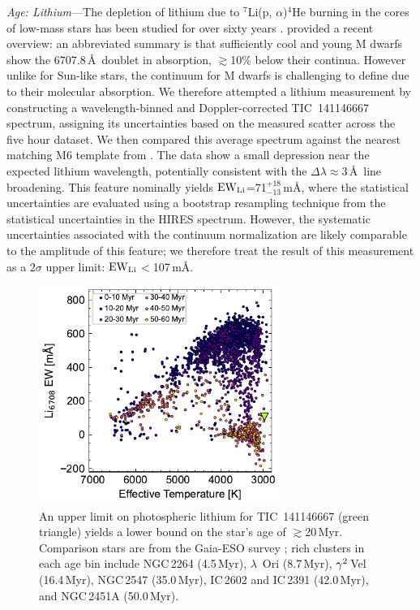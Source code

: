\documentclass{nature3}
\begin{document}
\begin{methods}
{\it Age: Lithium}---The depletion of lithium due to $^7$Li(p,
$\alpha$)$^4$He burning in the cores of low-mass stars has been studied
for over sixty years \cite{Hayashi1963,Bildsten1997,Burke2004}.
\cite{Wood2023} provided a recent overview: an abbreviated
summary is that sufficiently cool and young M dwarfs show the 6707.8\,\AA\
doublet in absorption, $\gtrsim$10\% below their continua.  However unlike
for Sun-like stars, the continuum for M dwarfs is challenging to define due to
their molecular absorption.  We therefore attempted a lithium measurement by
constructing a wavelength-binned and Doppler-corrected TIC~141146667
spectrum, assigning its uncertainties based on the measured scatter
across the five hour dataset.  We then compared this average spectrum
against the nearest matching M6 template from \cite{Bochanski2007}.  The
data show a small depression near the expected lithium wavelength,
potentially consistent with the $\Delta \lambda$$\approx$3\,\AA\ line
broadening.  This feature nominally yields ${\rm EW}_{\rm
Li}$=71$^{+18}_{-13}$\,m\AA, where the statistical uncertainties are
evaluated using a bootstrap resampling technique from the statistical
uncertainties in the HIRES spectrum.  However, the systematic uncertainties associated
with the continuum normalization are likely comparable to
the amplitude of this feature; we therefore treat the result of this
measurement as a $2\sigma$ upper limit: ${\rm EW}_{\rm Li}$$<$107\,m\AA.


\begin{figure}[!t]
  \centering
  \includegraphics[width=0.7\textwidth]{figures/sf2.pdf}
  \caption{An upper limit on photospheric lithium for TIC~141146667
  (green triangle) yields a lower bound on the star's age of
  $\gtrsim$20\,Myr.  Comparison stars are from the Gaia-ESO survey
  \cite{Jeffries2023}; rich clusters in each age bin include NGC\,2264
  (4.5\,Myr), $\lambda$~Ori (8.7\,Myr), ${\rm \gamma}^2$\,Vel
  (16.4\,Myr), NGC\,2547 (35.0\,Myr), IC\,2602 and IC\,2391 (42.0\,Myr),
  and NGC\,2451A (50.0\,Myr). }
  \label{fig:liew_population}
\end{figure}




\end{methods}
\end{document}
